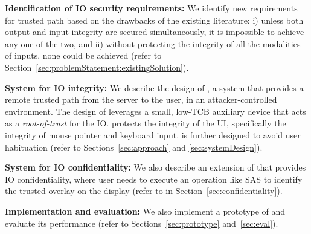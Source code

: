 \begin{mylist}
  \item \textbf{Identification of IO security requirements:} We identify new requirements for trusted path based on the drawbacks of the existing literature: i) unless both output and input integrity are secured simultaneously, it is impossible to achieve any one of the two, and ii) without protecting the integrity of all the modalities of inputs, none could be achieved (refer to Section~\ref{sec:problemStatement:existingSolution}).
  
   
  \item \textbf{System for IO integrity:} We describe the design of \name, a system that provides a remote trusted path from the server to the user, in an attacker-controlled environment. The design of \name leverages a small, low-TCB auxiliary device that acts as a \emph{root-of-trust} for the IO. \name protects the integrity of the UI, specifically the integrity of mouse pointer and keyboard input. \name is further designed to avoid user habituation (refer to Sections~\ref{sec:approach} and \ref{sec:systemDesign}).
  
  \item \textbf{System for IO confidentiality:} We also describe an extension of \name that provides IO confidentiality, where user needs to execute an operation like SAS to identify the trusted overlay on the display (refer to in Section~\ref{sec:confidentiality}).
  
   
  \item \textbf{Implementation and evaluation:} We also implement a prototype of \name and evaluate its performance (refer to Sections~\ref{sec:prototype} and~\ref{sec:eval}).
\end{mylist}


